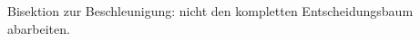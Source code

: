 \begin{notes}
\item Bisektion zur Beschleunigung: nicht den kompletten Entscheidungsbaum
  abarbeiten.
\end{notes}








